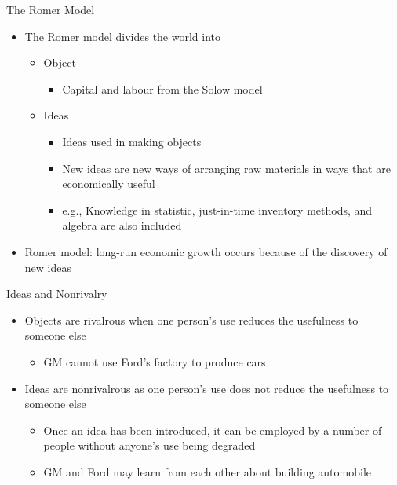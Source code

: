 \documentclass[aspectratio=1610]{beamer}
\begin{document}
\begin{frame}[wide]{The Romer Model}
	\begin{itemize}
		\item The Romer model divides the world into
		\begin{itemize}
			\item Object
			\begin{itemize}
				\item Capital and labour from the Solow model
			\end{itemize}
			\item Ideas
			\begin{itemize}
				\item Ideas used in making objects
				\item New ideas are new ways of arranging raw materials in ways that are economically useful
				\item e.g., Knowledge in statistic, just-in-time inventory methods, and algebra are also included
			\end{itemize}
		\end{itemize}
		\item Romer model: long-run economic growth occurs because of the discovery of new ideas
	\end{itemize}
\end{frame}

\begin{frame}[wide]{Ideas and Nonrivalry}
	\begin{itemize}
		\item Objects are rivalrous when one person’s use reduces the usefulness to someone else
		\begin{itemize}
			\item GM cannot use Ford's factory to produce cars
		\end{itemize}
		\item Ideas are nonrivalrous  as one person’s use does not reduce the usefulness to someone else
		\vspace{1mm}
		\begin{itemize}
			\item Once an idea has been introduced, it can be employed by a number of people without anyone’s use being degraded
			\item GM and Ford may learn from each other about building automobile
		\end{itemize}
	\end{itemize}
\end{frame}
\end{document}

